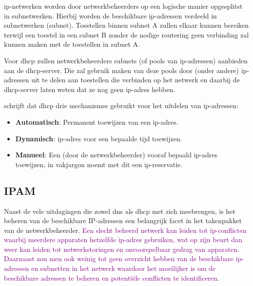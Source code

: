\acrshort{ip}-netwerken worden door netwerkbeheerders op een logische manier opgesplitst in subnetwerken. Hierbij worden de beschikbare \acrshort{ip}-adressen verdeeld in subnetwerken (subnet). Toestellen binnen subnet A zullen elkaar kunnen bereiken terwijl een toestel in een subnet B zonder de nodige routering geen verbinding zal kunnen maken met de toestellen in subnet A.

Voor \acrshort{dhcp} zullen netwerkbeheerders subnets (of pools van \acrshort{ip}-adressen) aanbieden aan de \acrshort{dhcp}-server. Die zal gebruik maken van deze pools door (onder andere) \acrshort{ip}-adressen uit te delen aan toestellen die verbinden op het netwerk en daarbij de \acrshort{dhcp}-server laten weten dat ze nog geen \acrshort{ip}-adres hebben.

\textcite{Droms1997} schrijft dat \acrshort{dhcp} drie mechanismes gebruikt voor het uitdelen van \acrshort{ip}-adressen:
\begin{itemize}
    \item \textbf{Automatisch}: Permanent toewijzen van een \acrshort{ip}-adres.
    \item \textbf{Dynamisch}: \acrshort{ip}-adres voor een bepaalde tijd toewijzen.
    \item \textbf{Manueel}: Een (door de netwerkbeheerder) vooraf bepaald \acrshort{ip}-adres toewijzen, in vakjargon noemt met dit een \acrshort{ip}-reservatie.
\end{itemize}

\subsection{IPAM}
Naast de vele uitdagingen die zowel \acrshort{dns} als \acrshort{dhcp} met zich meebrengen, is het beheren van de beschikbare IP-adressen een belangrijk facet in het takenpakket van de netwerkbeheerder. \textcolor{purple}{Een slecht beheerd netwerk kan leiden tot \acrshort{ip}-conflicten waarbij meerdere apparaten hetzelfde \acrshort{ip}-adres gebruiken, wat op zijn beurt dan weer kan leiden tot netwerkstoringen en onvoorspelbaar gedrag van apparaten. Daarnaast zou men ook weinig tot geen overzicht hebben van de beschikbare \acrshort{ip}-adressen en subnetten in het netwerk waardoor het moeilijker is om de beschikbare adressen te beheren en potentiële conflicten te identificeren.}

